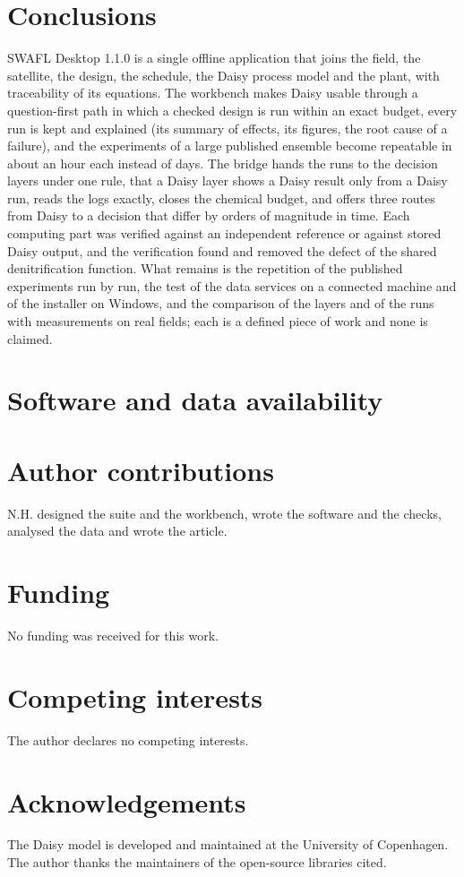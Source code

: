 \section{Conclusions}
SWAFL Desktop 1.1.0 is a single offline application that joins the field, the satellite, the design, the schedule, the Daisy process model and the plant, with traceability of its equations. The workbench makes Daisy usable through a question-first path in which a checked design is run within an exact budget, every run is kept and explained (its summary of effects, its figures, the root cause of a failure), and the experiments of a large published ensemble become repeatable in about an hour each instead of days. The bridge hands the runs to the decision layers under one rule, that a Daisy layer shows a Daisy result only from a Daisy run, reads the logs exactly, closes the chemical budget, and offers three routes from Daisy to a decision that differ by orders of magnitude in time. Each computing part was verified against an independent reference or against stored Daisy output, and the verification found and removed the defect of the shared denitrification function. What remains is the repetition of the published experiments run by run, the test of the data services on a connected machine and of the installer on Windows, and the comparison of the layers and of the runs with measurements on real fields; each is a defined piece of work and none is claimed.

\section*{Software and data availability}
\suiteavail
\section*{Author contributions}
N.H. designed the suite and the workbench, wrote the software and the checks, analysed the data and wrote the article.
\section*{Funding}
No funding was received for this work.
\section*{Competing interests}
The author declares no competing interests.

\section*{Acknowledgements}
The Daisy model is developed and maintained at the University of Copenhagen. The author thanks the maintainers of the open-source libraries cited.

